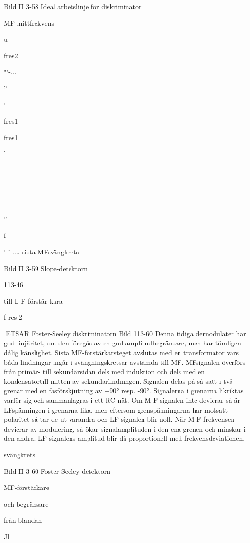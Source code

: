{{{Bild II 3-58 Ideal arbetslinje för diskriminator

MF-mittfrekvens

u

fres2

"'-...

''

'\

fres1

fres1

'

\

\

\

''

f

' ' ....
sista MFsvängkrets

Bild II 3-59 Slope-detektorn

113-46

till
L F-förstår kara

f res 2

ETSAR
Foster-Seeley diskriminatorn
Bild 113-60
Denna tidiga dernodulater har god linjäritet,
om den föregås av en god amplitudbegränsare, men har tämligen dålig känslighet.
Sista MF-förstärkarsteget avslutas med
en transformator vars båda lindningar ingår
i svängningskretsar avstämda till MF. MFsignalen överförs från primär- till sekundärsidan dels med induktion och dels med en
kondensatortill mitten av sekundärlindningen. Signalen delas på så sätt i två grenar
med en fasförskjutning av +90° resp. -90°.
Signalerna i grenarna likriktas varför sig och
sammanlagras i ett RC-nät.
Om M F-signalen inte devierar så är LFspänningen i grenarna lika, men eftersom
grenspänningarna har motsatt polaritet så
tar de ut varandra och LF-signalen blir noll.
När M F-frekvensen devierar av modulering,
så ökar signalamplituden i den ena grenen
och minskar i den andra. LF-signalens amplitud blir då proportionell med frekvensdeviationen.

svängkrets

Bild II 3-60 Foster-Seeley detektorn

MF-förstärkare

och begränsare

från blandan~

Jl

}}}
